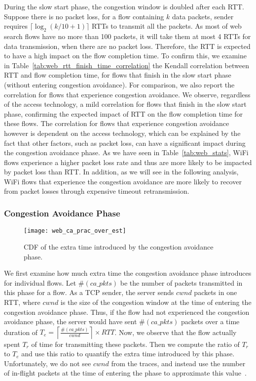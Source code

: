 During the slow start phase, the congestion window is doubled after each RTT. Suppose there is no packet loss, for a flow containing $k$ data packets, sender requires $\lceil{\log_2 (k/10+1)}\rceil$ RTTs to transmit all the packets. As most of web search flows have no more than 100 packets, it will take them at most 4 RTTs for data transmission, when there are no packet loss. Therefore, the RTT is expected to have a high impact on the flow completion time. To confirm this, we examine in Table~\ref{tab:web_rtt_finish_time_correlation} the Kendall correlation between RTT and flow completion time, for flows that finish in the slow start phase (\ie without entering congestion avoidance). For comparison, we also report the correlation for flows that experience congestion avoidance. We observe, regardless of the access technology, a mild correlation for flows that finish in the slow start phase, confirming the expected impact of RTT on the flow completion time for these flows. The correlation for flows that experience congestion avoidance however is dependent on the access technology, which can be explained by the fact that other factors, such as packet loss, can have a significant impact during the congestion avoidance phase. As we have seen in Table~\ref{tab:web_stats}, WiFi flows experience a higher packet loss rate and thus are more likely to be impacted by packet loss than RTT. In addition, as we will see in the following analysis, WiFi flows that experience the congestion avoidance are more likely to recover from packet losses through expensive timeout retransmission.


\subsubsection{Congestion Avoidance Phase}

\begin{figure}[th]
\centering
\texttt{[image: web\_ca\_prac\_over\_est]}
\caption{CDF of the extra time introduced by the congestion avoidance phase.}
\label{fig:web_ca_round}
\minsqueeze
\end{figure}

We first examine how much extra time the congestion avoidance phase introduces for individual flows. Let $\#(ca\_pkts)$ be the number of packets transmitted in this phase for a flow. As a TCP sender, the server sends $cwnd$ packets in one RTT, where $cwnd$ is the size of the congestion window at the time of entering the congestion avoidance phase. Thus, if the flow had not experienced the congestion avoidance phase, the server would have sent $\#(ca\_pkts)$ packets over a time duration of $T_e =  \left \lceil{\frac{\#(ca\_pkts)}{cwnd}} \right \rceil  \times RTT$. Now, we observe that the flow actually spent $T_r$ of time for transmitting these packets. Then we compute the ratio of  $T_r$ to $T_e$ and use this ratio to quantify the extra time introduced by this phase. Unfortunately, we do not see $cwnd$ from the traces, and instead use the number of in-flight packets at the time of entering the phase to approximate this value~\cite{rfc56812009tcp}. 
 
